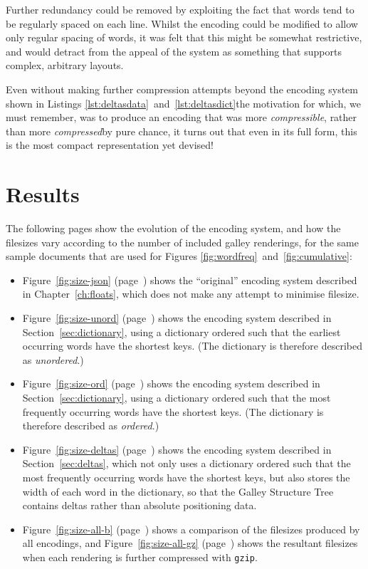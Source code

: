 Further redundancy could be removed by exploiting the fact that words tend to be regularly spaced on each line. Whilst the encoding could be modified to allow only regular spacing of words, it was felt that this might be somewhat restrictive, and would detract from the appeal of the system as something that supports complex, arbitrary layouts.

Even without making further compression attempts beyond the encoding system shown in Listings \ref{lst:deltasdata}~and~\ref{lst:deltasdict}\ed the motivation for which, we must remember, was to produce an encoding that was more \emph{compressible}, rather than more \emph{compressed}\ed by pure chance, it turns out that even in its full form, this is the most compact representation yet devised!



\section{Results}

The following pages show the evolution of the encoding system, and how the filesizes vary according to the number of included galley renderings, for the same sample documents that are used for Figures \ref{fig:wordfreq}~and~\ref{fig:cumulative}:

\begin{itemize}

 \item Figure~\ref{fig:size-json} (page~\pageref{fig:size-json}) shows the ``original'' encoding system described in Chapter~\ref{ch:floats}, which does not make any attempt to minimise filesize.

 \item Figure~\ref{fig:size-unord} (page~\pageref{fig:size-unord}) shows the encoding system described in Section~\ref{sec:dictionary}, using a dictionary ordered such that the earliest occurring words have the shortest keys. (The dictionary is therefore described as \emph{unordered}.)

 \item Figure~\ref{fig:size-ord} (page~\pageref{fig:size-ord}) shows the encoding system described in Section~\ref{sec:dictionary}, using a dictionary ordered such that the most frequently occurring words have the shortest keys. (The dictionary is therefore described as \emph{ordered}.)

 \item Figure~\ref{fig:size-deltas} (page~\pageref{fig:size-deltas}) shows the encoding system described in Section~\ref{sec:deltas}, which not only uses a dictionary ordered such that the most frequently occurring words have the shortest keys, but also stores the width of each word in the dictionary, so that the Galley Structure Tree contains deltas rather than absolute positioning data.
 
 \item Figure~\ref{fig:size-all-b} (page~\pageref{fig:size-all-b}) shows a comparison of the filesizes produced by all encodings, and Figure~\ref{fig:size-all-gz} (page~\pageref{fig:size-all-gz}) shows the resultant filesizes when each rendering is further compressed with \texttt{gzip}.
\end{itemize}


